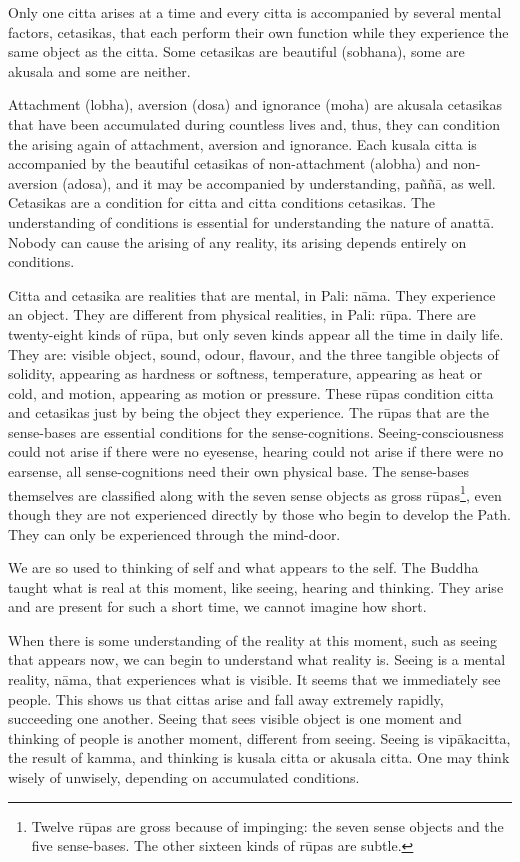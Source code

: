 Only one citta arises at a time and every citta is accompanied by
several mental factors, cetasikas, that each perform their own function
while they experience the same object as the citta. Some cetasikas are
beautiful (sobhana), some are akusala and some are neither.

Attachment (lobha), aversion (dosa) and ignorance (moha) are akusala
cetasikas that have been accumulated during countless lives and, thus,
they can condition the arising again of attachment, aversion and
ignorance. Each kusala citta is accompanied by the beautiful cetasikas
of non-attachment (alobha) and non-aversion (adosa), and it may be
accompanied by understanding, paññā, as well. Cetasikas are a condition
for citta and citta conditions cetasikas. The understanding of
conditions is essential for understanding the nature of anattā. Nobody
can cause the arising of any reality, its arising depends entirely on
conditions.

Citta and cetasika are realities that are mental, in Pali: nāma. They
experience an object. They are different from physical realities, in
Pali: rūpa. There are twenty-eight kinds of rūpa, but only seven kinds
appear all the time in daily life. They are: visible object, sound,
odour, flavour, and the three tangible objects of solidity, appearing as
hardness or softness, temperature, appearing as heat or cold, and
motion, appearing as motion or pressure. These rūpas condition citta and
cetasikas just by being the object they experience. The rūpas that are
the sense-bases are essential conditions for the sense-cognitions.
Seeing-consciousness could not arise if there were no eyesense, hearing
could not arise if there were no earsense, all sense-cognitions need
their own physical base. The sense-bases themselves are classified along
with the seven sense objects as gross
rūpas\footnote{Twelve rūpas are gross
because of impinging: the seven sense objects and the five sense-bases.
The other sixteen kinds of rūpas are subtle.}, even though they
are not experienced directly by those who begin to develop the Path.
They can only be experienced through the mind-door.

We are so used to thinking of self and what appears to the self. The
Buddha taught what is real at this moment, like seeing, hearing and
thinking. They arise and are present for such a short time, we cannot
imagine how short.

When there is some understanding of the reality at this moment, such as
seeing that appears now, we can begin to understand what reality is.
Seeing is a mental reality, nāma, that experiences what is visible. It
seems that we immediately see people. This shows us that cittas arise
and fall away extremely rapidly, succeeding one another. Seeing that
sees visible object is one moment and thinking of people is another
moment, different from seeing. Seeing is vipākacitta, the result of
kamma, and thinking is kusala citta or akusala citta. One may think
wisely of unwisely, depending on accumulated conditions.

